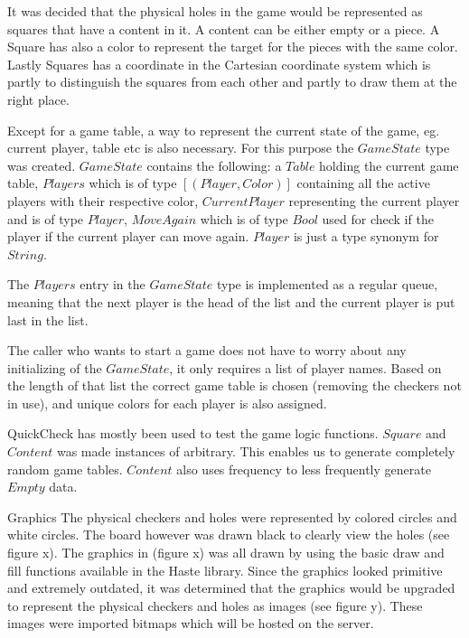 \documentclass[a4paper]{article}
\begin{document}
It was decided that the physical holes in the game would be represented as squares that have a content in it. A content can be either empty or a piece. A Square has also a color to represent the target for the pieces with the same color. Lastly Squares has a coordinate in the Cartesian coordinate system which is partly to distinguish the squares from each other and partly to draw them at the right place.

Except for a game table, a way to represent the current state of the game, eg. current player, table etc is also necessary. For this purpose the $GameState$ type was created. $GameState$ contains the following: a $Table$ holding the current game table, $Players$ which is of type $[(Player,Color)]$ containing all the active players with their respective color, $CurrentPlayer$ representing the current player and is of type $Player$, $MoveAgain$ which is of type $Bool$ used for check if the player if the current player can move again. $Player$ is just a type synonym for $String$.

The $Players$ entry in the $GameState$ type is implemented as a regular queue, meaning that the next player is the head of the list and the current player is put last in the list.

The caller who wants to start a game does not have to worry about any initializing of the $GameState$, it only requires a list of player names. Based on the length of that list the correct game table is chosen (removing the checkers not in use), and unique colors for each player is also assigned.

QuickCheck has mostly been used to test the game logic functions. $Square$ and $Content$ was made instances of arbitrary. This enables us to generate completely random game tables. $Content$ also uses frequency to less frequently generate $Empty$ data.



Graphics
The physical checkers and holes were represented by colored circles and white circles. The board however was drawn black to clearly view the holes (see figure x). The graphics in (figure x) was all drawn by using the basic draw and fill functions available in the Haste library. Since the graphics looked primitive and extremely outdated, it was determined that the graphics would be upgraded to represent the physical checkers and holes as images (see figure y). These images were imported bitmaps which will be hosted on the server.
\end{document}
